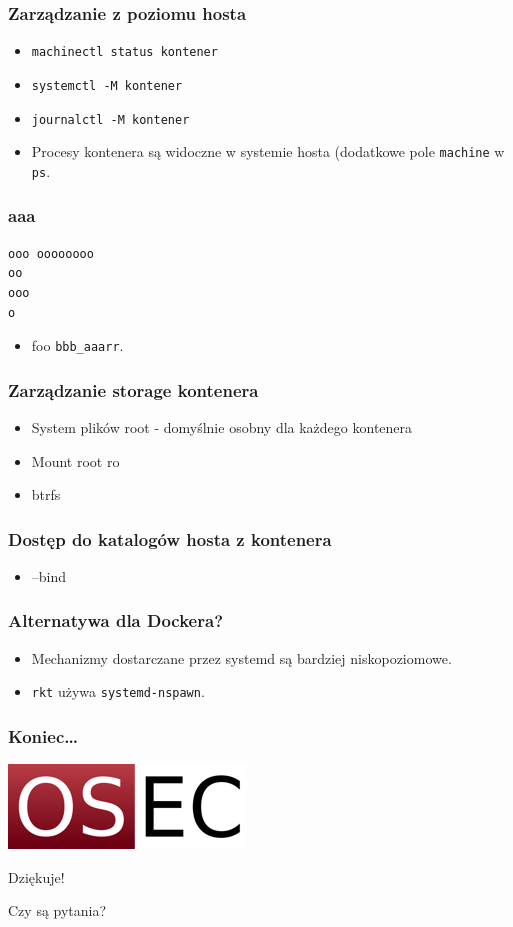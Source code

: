 \documentclass[dvipsnames,table]{beamer}
\begin{document}
\begin{frame}
\frametitle{Zarządzanie z poziomu hosta}
\begin{itemize}
	\item {\tt machinectl status kontener}
	\item {\tt systemctl -M kontener}
	\item {\tt journalctl -M kontener}
	\item Procesy kontenera są widoczne w systemie hosta (dodatkowe pole {\tt machine} w {\tt ps}.
\end{itemize}
\end{frame}

\begin{frame}[fragile]
\frametitle{aaa}
\scriptsize
\begin{verbatim}
ooo oooooooo
oo
ooo
o
\end{verbatim}
\normalsize
\begin{itemize}
	\item foo {\tt bbb\_aaarr}.
\end{itemize}

\end{frame}

\begin{frame}
\frametitle{Zarządzanie storage kontenera}
\begin{itemize}
	\item System plików root - domyślnie osobny dla każdego kontenera
	\item Mount root ro
	\item btrfs
\end{itemize}
\end{frame}

\begin{frame}
\frametitle{Dostęp do katalogów hosta z kontenera}
\begin{itemize}
	\item --bind
\end{itemize}
\end{frame}

\begin{frame}
\frametitle{Alternatywa dla Dockera?}
\begin{itemize}
	\item Mechanizmy dostarczane przez systemd są bardziej niskopoziomowe.
	\item {\tt rkt} używa {\tt systemd-nspawn}.
\end{itemize}	
\end{frame}
\begin{frame}

\frametitle{Koniec\ldots}
\begin{center}
\includegraphics[scale=0.5]{img-oseclogo.png}

Dziękuje!

Czy są pytania?

\end{center}

\end{frame}
 
\end{document}
